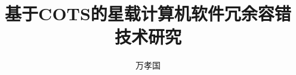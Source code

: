 \documentclass[doctor]{hnuthesis}
\title{基于COTS的星载计算机软件冗余容错技术研究}
\author{万孝国}
\begin{document}
\maketitle


\tableofcontents

\begingroup
	\renewcommand*{\addvspace}[1]{}
	\newcommand{\loflabel}{图} 
	\renewcommand{\numberline}[1]{\loflabel~#1\hspace*{1em}}	
	\listoffigures
	\newcommand{\lotlabel}{表}
	\renewcommand{\numberline}[1]{\lotlabel~#1\hspace*{1em}}
	\listoftables
\endgroup


\mainmatter





% 


\appendix



\backmatter

\end{document}
